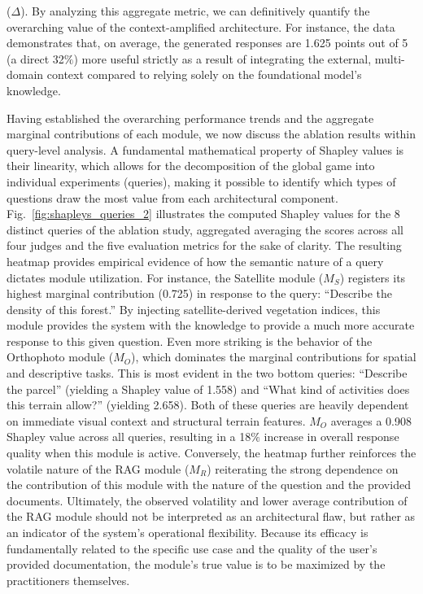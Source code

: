 \documentclass[preprint,review,12pt,authoryear]{elsarticle}
\begin{document}
($\Delta$). By analyzing this aggregate metric, we can definitively quantify the overarching value of the context-amplified architecture. For instance, the data demonstrates that, on average, the generated responses are 1.625 points out of 5 (a direct 32$\%$) more useful strictly as a result of integrating the external, multi-domain context compared to relying solely on the foundational model's knowledge.

Having established the overarching performance trends and the aggregate marginal contributions of each module, we now discuss the ablation results within query-level analysis. A fundamental mathematical property of Shapley values is their linearity, which allows for the decomposition of the global game into individual experiments (queries), making it possible to identify which types of questions draw the most value from each architectural component. Fig.~\ref{fig:shapleys_queries_2} illustrates the computed Shapley values for the 8 distinct queries of the ablation study, aggregated averaging the scores across all four judges and the five evaluation metrics for the sake of clarity. The resulting heatmap provides empirical evidence of how the semantic nature of a query dictates module utilization. For instance, the Satellite module ($M_S$) registers its highest marginal contribution (0.725) in response to the query: ``Describe the density of this forest.'' By injecting satellite-derived vegetation indices, this module provides the system with the knowledge to provide a much more accurate response to this given question. Even more striking is the behavior of the Orthophoto module ($M_O$), which dominates the marginal contributions for spatial and descriptive tasks. This is most evident in the two bottom queries: ``Describe the parcel'' (yielding a Shapley value of 1.558) and ``What kind of activities does this terrain allow?'' (yielding 2.658). Both of these queries are heavily dependent on immediate visual context and structural terrain features. $M_O$ averages a 0.908 Shapley value across all queries, resulting in a 18$\%$ increase in overall response quality when this module is active. Conversely, the heatmap further reinforces the volatile nature of the RAG module ($M_R$) reiterating the strong dependence on the contribution of this module with the nature of the question and the provided documents. Ultimately, the observed volatility and lower average contribution of the RAG module should not be interpreted as an architectural flaw, but rather as an indicator of the system's operational flexibility. Because its efficacy is fundamentally related to the specific use case and the quality of the user's provided documentation, the module's true value is to be maximized by the practitioners themselves.  
\end{document}
